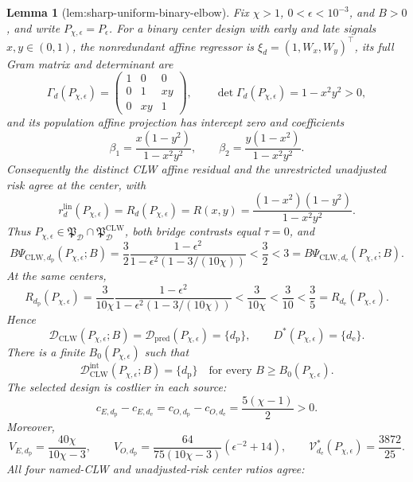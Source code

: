 \documentclass{article}
\newtheorem{lemma}{Lemma}
\begin{document}
\begin{lemma}[lem:sharp-uniform-binary-elbow]\label{lem:sharp-uniform-binary-elbow}
Fix \(\chi>1\), \(0<\epsilon<10^{-3}\), and \(B>0\), and write \(P_{\chi,\epsilon}=P_\epsilon\). For a binary center design with early and late signals \(x,y\in(0,1)\), the nonredundant affine regressor is \(\xi_d=(1,W_x,W_y)^\top\), its full Gram matrix and determinant are
\[
 \Gamma_d(P_{\chi,\epsilon})=
 \begin{pmatrix}1&0&0\\0&1&xy\\0&xy&1\end{pmatrix},
 \qquad
 \det\Gamma_d(P_{\chi,\epsilon})=1-x^2y^2>0,              \tag{1}
\]
and its population affine projection has intercept zero and coefficients
\[
 \beta_1=\frac{x(1-y^2)}{1-x^2y^2},
 \qquad
 \beta_2=\frac{y(1-x^2)}{1-x^2y^2}.                       \tag{2}
\]
Consequently the distinct CLW affine residual and the unrestricted unadjusted risk agree at the center, with
\[
 r_d^{\mathrm{lin}}(P_{\chi,\epsilon})
 =R_d(P_{\chi,\epsilon})
 =R(x,y)=\frac{(1-x^2)(1-y^2)}{1-x^2y^2}.                 \tag{3}
\]
Thus \(P_{\chi,\epsilon}\in\mathfrak P_{\mathcal D}\cap\mathfrak P_{\mathcal D}^{\mathrm{CLW}}\), both bridge contrasts equal \(\tau=0\), and
\[
 B\Psi_{\mathrm{CLW},d_{\mathrm p}}(P_{\chi,\epsilon};B)
 =\frac32\frac{1-\epsilon^2}{1-\epsilon^2(1-3/(10\chi))}
 <\frac32<3
 =B\Psi_{\mathrm{CLW},d_{\mathrm e}}(P_{\chi,\epsilon};B). \tag{4}
\]
At the same centers,
\[
 R_{d_{\mathrm p}}(P_{\chi,\epsilon})
 =\frac{3}{10\chi}\frac{1-\epsilon^2}
 {1-\epsilon^2(1-3/(10\chi))}
 <\frac{3}{10\chi}<\frac3{10}<\frac35
 =R_{d_{\mathrm e}}(P_{\chi,\epsilon}).                  \tag{5}
\]
Hence
\[
 \mathcal D_{\mathrm{CLW}}(P_{\chi,\epsilon};B)
 =\mathcal D_{\mathrm{pred}}(P_{\chi,\epsilon})
 =\{d_{\mathrm p}\},
 \qquad
 D^*(P_{\chi,\epsilon})=\{d_{\mathrm e}\}.              \tag{6}
\]
There is a finite \(B_0(P_{\chi,\epsilon})\) such that
\[
 \mathcal D_{\mathrm{CLW}}^{\mathrm{int}}(P_{\chi,\epsilon};B)
 =\{d_{\mathrm p}\}
 \quad\text{for every }B\ge B_0(P_{\chi,\epsilon}).      \tag{7}
\]
The selected design is costlier in each source:
\[
 c_{E,d_{\mathrm p}}-c_{E,d_{\mathrm e}}
 =c_{O,d_{\mathrm p}}-c_{O,d_{\mathrm e}}
 =\frac{5(\chi-1)}2>0.
\]
Moreover,
\[
 V_{E,d_{\mathrm p}}=\frac{40\chi}{10\chi-3},
 \qquad
 V_{O,d_{\mathrm p}}
 =\frac{64}{75(10\chi-3)}(\epsilon^{-2}+14),
 \qquad
 \mathcal V_{d_{\mathrm e}}^*(P_{\chi,\epsilon})=\frac{3872}{25}.
\]
All four named-CLW and unadjusted-risk center ratios agree:
\[
\begin{aligned}

\end{aligned}\]
\end{lemma}
\end{document}
